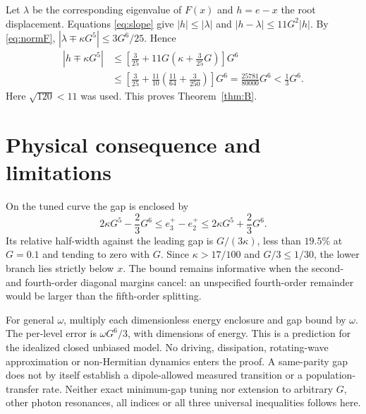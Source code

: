 \documentclass[11pt]{article}
\begin{document}
Let $\lambda$ be the corresponding eigenvalue of $F(x)$ and $h=e-x$ the root displacement. Equations \eqref{eq:slope} give
$|h|\leq|\lambda|$ and $|h-\lambda|\leq11G^2|h|$.
By \eqref{eq:normF}, $|\lambda\mp\kappa G^5|\leq3G^6/25$. Hence
\begin{align}
|h\mp\kappa G^5|
&\leq \left[\frac3{25}+11G\left(\kappa+\frac3{25}G\right)\right]G^6\nonumber\\
&\leq \left[\frac3{25}+\frac{11}{10}
\left(\frac{11}{64}+\frac3{250}\right)\right]G^6
=\frac{25781}{80000}G^6<\frac13G^6.\label{eq:last}
\end{align}
Here $\sqrt{120}<11$ was used. This proves Theorem~\ref{thm:B}.

\section{Physical consequence and limitations}
On the tuned curve the gap is enclosed by
\begin{equation}\label{eq:gap}
2\kappa G^5-\frac23G^6
\leq e_3^+-e_2^+
\leq2\kappa G^5+\frac23G^6 .
\end{equation}
Its relative half-width against the leading gap is $G/(3\kappa)$, less than $19.5\%$ at $G=0.1$ and tending to zero with $G$. Since $\kappa>17/100$ and $G/3\leq1/30$, the lower branch lies strictly below $x$. The bound remains informative when the second- and fourth-order diagonal margins cancel: an unspecified fourth-order remainder would be larger than the fifth-order splitting.

For general $\omega$, multiply each dimensionless energy enclosure and gap bound by $\omega$. The per-level error is $\omega G^6/3$, with dimensions of energy. This is a prediction for the idealized closed unbiased model. No driving, dissipation, rotating-wave approximation or non-Hermitian dynamics enters the proof. A same-parity gap does not by itself establish a dipole-allowed measured transition or a population-transfer rate. Neither exact minimum-gap tuning nor extension to arbitrary $G$, other photon resonances, all indices or all three universal inequalities follows here.

\appendix
\end{document}

